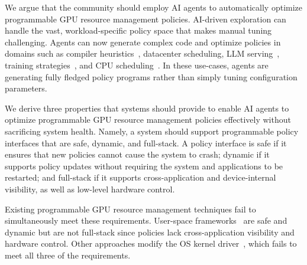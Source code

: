 We argue that the community should employ AI agents to automatically optimize programmable GPU resource management policies.
AI-driven exploration can handle the vast, workload-specific policy space that makes manual tuning challenging.
Agents can now generate complex code and optimize policies in domains such as compiler heuristics~\cite{alphaevolve2025}, datacenter scheduling, LLM serving~\cite{hamadanian2025glia,cheng2025barbarians}, training strategies~\cite{ding2025asap}, and CPU scheduling~\cite{zheng2025schedcp}.
In these use-cases, agents are generating fully fledged policy programs rather than simply tuning configuration parameters.

We derive three properties that systems should provide to enable AI agents to optimize programmable GPU resource management policies effectively without sacrificing system health.
Namely, a system should support programmable policy interfaces that are safe, dynamic, and full-stack.
A policy interface is safe if it ensures that new policies cannot cause the system to crash; dynamic if it supports policy updates without requiring the system and applications to be restarted; and full-stack if it supports cross-application and device-internal visibility, as well as low-level hardware control.

Existing programmable GPU resource management techniques fail to simultaneously meet these requirements.
User-space frameworks~\cite{ng2023paella,shen2025xsched,gim2025pie,chen2025ktransformers} are safe and dynamic but are not full-stack since policies lack cross-application visibility and hardware control.
Other approaches modify the OS kernel driver~\cite{kato2011timegraph,kato2012gdev,kernelintercept,fan2025gpreempt,wang2024gcaps}, which fails to meet all three of the requirements.

